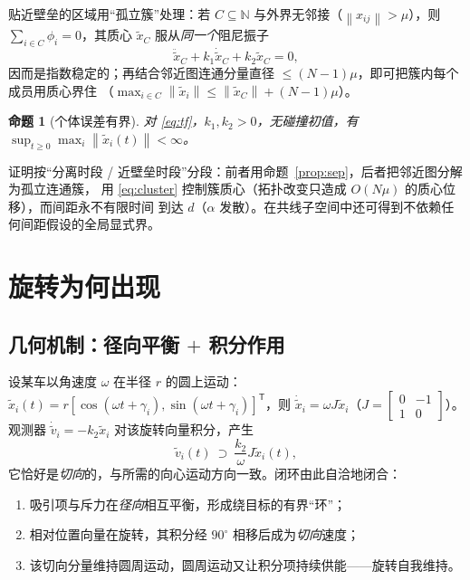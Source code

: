 \documentclass[11pt,a4paper]{ctexart}
\theoremstyle{plain}
\newtheorem{proposition}{命题}
\theoremstyle{definition}
\theoremstyle{remark}
\newcommand{\NN}{\mathbb{N}}
\newcommand{\txi}{\tilde{x}}
\newcommand{\tv}{\tilde{v}}
\newcommand{\norm}[1]{\left\|#1\right\|}
\begin{document}
贴近壁垒的区域用“孤立簇”处理：若 $C\subseteq\NN$ 与外界无邻接（$\norm{x_{ij}}>\mu$），则
$\sum_{i\in C}\phi_i=0$，其质心 $\txi_C$ 服从\emph{同一个}阻尼振子
\begin{equation}
  \ddot\txi_C+k_1\dot\txi_C+k_2\txi_C=0 ,
  \label{eq:cluster}
\end{equation}
因而是指数稳定的；再结合邻近图连通分量直径 $\le(N-1)\mu$，即可把簇内每个成员用质心界住
（$\max_{i\in C}\norm{\txi_i}\le\norm{\txi_C}+(N-1)\mu$）。

\begin{proposition}[个体误差有界]
\label{prop:bounded}
对 \eqref{eq:tf}，$k_1,k_2>0$，无碰撞初值，有 $\sup_{t\ge0}\max_i\norm{\txi_i(t)}<\infty$。
\end{proposition}
证明按“分离时段 / 近壁垒时段”分段：前者用命题~\ref{prop:sep}，后者把邻近图分解为孤立连通簇，
用 \eqref{eq:cluster} 控制簇质心（拓扑改变只造成 $O(N\mu)$ 的质心位移），而间距永不有限时间
到达 $d$（$\alpha$ 发散）。在共线子空间中还可得到不依赖任何间距假设的全局显式界。

\section{旋转为何出现}
\label{sec:why}

\subsection{几何机制：径向平衡 $+$ 积分作用}
设某车以角速度 $\omega$ 在半径 $r$ 的圆上运动：
$\txi_i(t)=r[\cos(\omega t+\gamma_i),\sin(\omega t+\gamma_i)]^{\mathsf T}$，则
$\dot\txi_i=\omega J\txi_i$（$J=\begin{bmatrix}0&-1\\1&0\end{bmatrix}$）。观测器
$\dot\tv_i=-k_2\txi_i$ 对该旋转向量积分，产生
\begin{equation}
  \tv_i(t)\ \supset\ \frac{k_2}{\omega}J\txi_i(t),
  \label{eq:obs}
\end{equation}
它恰好是\emph{切向}的，与所需的向心运动方向一致。闭环由此自洽地闭合：
\begin{enumerate}[leftmargin=2.2em]
  \item 吸引项与斥力在\emph{径向}相互平衡，形成绕目标的有界“环”；
  \item 相对位置向量在旋转，其积分经 $90^\circ$ 相移后成为\emph{切向}速度；
  \item 该切向分量维持圆周运动，圆周运动又让积分项持续供能——旋转自我维持。
\end{enumerate}
\end{document}
